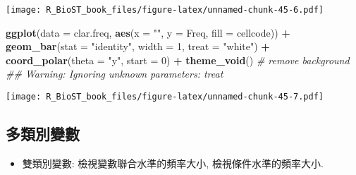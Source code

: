 \documentclass[
]{book}
\newenvironment{Shaded}{\begin{snugshade}}{\end{snugshade}}
\newcommand{\CommentTok}[1]{\textcolor[rgb]{0.56,0.35,0.01}{\textit{#1}}}
\newcommand{\DataTypeTok}[1]{\textcolor[rgb]{0.13,0.29,0.53}{#1}}
\newcommand{\DecValTok}[1]{\textcolor[rgb]{0.00,0.00,0.81}{#1}}
\newcommand{\KeywordTok}[1]{\textcolor[rgb]{0.13,0.29,0.53}{\textbf{#1}}}
\newcommand{\NormalTok}[1]{#1}
\newcommand{\OperatorTok}[1]{\textcolor[rgb]{0.81,0.36,0.00}{\textbf{#1}}}
\newcommand{\StringTok}[1]{\textcolor[rgb]{0.31,0.60,0.02}{#1}}
\providecommand{\tightlist}{%
  \setlength{\itemsep}{0pt}\setlength{\parskip}{0pt}}
\begin{document}
\texttt{[image: R\_BioST\_book\_files/figure-latex/unnamed-chunk-45-6.pdf]}

\begin{Shaded}
\begin{Highlighting}[]
\KeywordTok{ggplot}\NormalTok{(}\DataTypeTok{data =}\NormalTok{ clar.freq, }\KeywordTok{aes}\NormalTok{(}\DataTypeTok{x =} \StringTok{""}\NormalTok{, }\DataTypeTok{y =}\NormalTok{ Freq, }\DataTypeTok{fill =}\NormalTok{ cellcode)) }\OperatorTok{+}
\StringTok{  }\KeywordTok{geom\_bar}\NormalTok{(}\DataTypeTok{stat =} \StringTok{"identity"}\NormalTok{, }\DataTypeTok{width =} \DecValTok{1}\NormalTok{, }\DataTypeTok{treat =} \StringTok{"white"}\NormalTok{) }\OperatorTok{+}
\StringTok{  }\KeywordTok{coord\_polar}\NormalTok{(}\DataTypeTok{theta =} \StringTok{"y"}\NormalTok{, }\DataTypeTok{start =} \DecValTok{0}\NormalTok{) }\OperatorTok{+}
\StringTok{  }\KeywordTok{theme\_void}\NormalTok{() }\CommentTok{\# remove background}
\CommentTok{\#\# Warning: Ignoring unknown parameters: treat}
\end{Highlighting}
\end{Shaded}

\texttt{[image: R\_BioST\_book\_files/figure-latex/unnamed-chunk-45-7.pdf]}

\hypertarget{ux591aux985eux5225ux8b8aux6578}{%
\subsection{多類別變數}\label{ux591aux985eux5225ux8b8aux6578}}

\begin{itemize}
\tightlist
\item
  雙類別變數: 檢視變數聯合水準的頻率大小,
  檢視條件水準的頻率大小.
\end{itemize}
\end{document}
